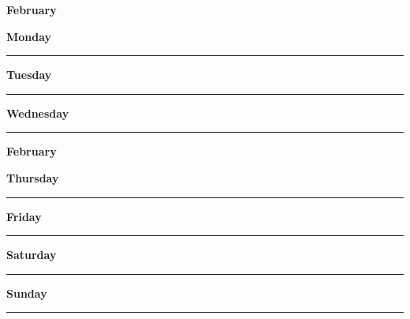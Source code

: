 \newpage

\textbf{\Large{February} \hfill \Large{}}
\vspace{0.3cm}

\begin{daybox}
 \textbf{Monday} \\
\rule{\linewidth}{0.02cm}
\end{daybox}

\begin{daybox}
\textbf{Tuesday} \\
\rule{\linewidth}{0.02cm}
\end{daybox}

\begin{daybox}
\textbf{Wednesday} \\
\rule{\linewidth}{0.02cm}
\end{daybox}

\newpage

\textbf{\Large{February} \hfill \Large{}}
\vspace{0.3cm}

\begin{daybox}
\textbf{Thursday} \\
\rule{\linewidth}{0.02cm}
\end{daybox}

\begin{daybox}
\textbf{Friday} \\
\rule{\linewidth}{0.02cm}
\end{daybox}

\begin{weekendbox}
\textbf{Saturday} \\
\rule{\linewidth}{0.02cm}
\tcblower
{}
\textbf{Sunday} \\
\rule{\linewidth}{0.02cm}
\end{weekendbox}